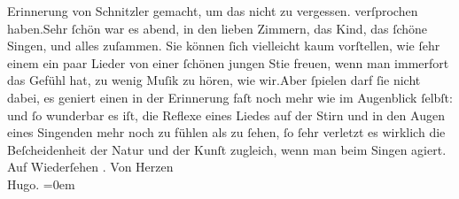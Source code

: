 \begin{ledgroupsized}[t]{13cm}
{{{                  Erinnerung von Schnitzler gemacht, um das
                  nicht zu vergessen.}}}\label{T_L01319-1h} verſprochen haben.\hspace*{1.5em}Sehr ſchön war es \label{K_L01319-2v}\label{K_L01319-2h} abend, in den lieben Zimmern, das Kind, das ſchöne Singen, und alles zuſammen. Sie können
               ſich vielleicht kaum vorſtellen, wie ſehr einem ein paar Lieder von einer ſchönen
               jungen Sti{\geminationm}e freuen, wenn {\pb}man immerfort das Gefühl hat, zu
               wenig Muſik zu hören, wie wir.\hspace*{1.5em}Aber ſpielen darf ſie
               nicht dabei, es geniert einen in der Erinnerung faſt noch mehr wie im Augenblick
               ſelbſt: und ſo wunderbar es iſt, die Reflexe eines Liedes auf der Stirn und in den
               Augen eines Singenden mehr noch zu fühlen als zu ſehen, ſo ſehr {\pb}verletzt es wirklich die
               Beſcheidenheit der Natur und der Kunſt zugleich, wenn man beim Singen agiert.\pend
           \pstart
           Auf Wiederſehen \label{K_L01319-3v}\label{K_L01319-3h}.\pend
           \pstart
           Von Herzen{\\[\baselineskip]}\spacefill\mbox{Hugo.}\pend
           \leftskip=0em{}
         
         \endnumbering{}\end{ledgroupsized}  \newcommand{\dateiname}{L01319}\newcommand{\titel}{Hugo von Hofmannsthal an Arthur Schnitzler, 27. 9. [1903]}\newcommand{\editorInnen}{ Martin Anton Müller und Gerd-Hermann Susen}
      